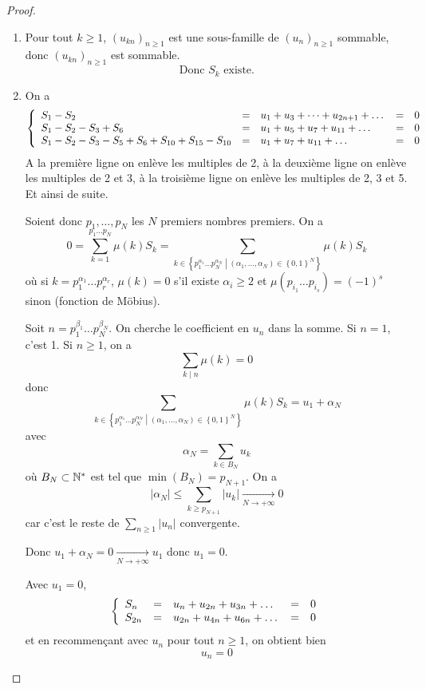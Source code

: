 \begin{proof}
	\phantom{}
	\begin{enumerate}
		\item Pour tout $k\geqslant1$, $\left(u_{kn}\right)_{n\geqslant1}$ est une sous-famille de $\left(u_{n}\right)_{n\geqslant1}$ sommable, donc $\left(u_{kn}\right)_{n\geqslant1}$ est sommable.
		$$\boxed{\text{Donc }S_{k}\text{ existe.}}$$

		\item On a 
		$$
		\left\{
			\begin{array}[]{lllll}
				S_{1}-S_{2} &= &u_{1}+u_{3}+\dots+u_{2n+1}+\dots &= &0\\
				S_{1}-S_{2}-S_{3}+S_{6} &= &u_{1}+u_{5}+u_{7}+u_{11}+\dots &= &0\\
				S_{1}-S_{2}-S_{3}-S_{5}+S_{6}+S_{10}+S_{15}-S_{10} &= &u_{1}+u_{7}+u_{11}+\dots &= &0
			\end{array}
		\right.
		$$
		A la première ligne on enlève les multiples de 2, à la deuxième ligne on enlève les multiples de 2 et 3, à la troisième ligne on enlève les multiples de 2, 3 et 5. Et ainsi de suite.

		Soient donc $p_{1},\dots,p_{N}$ les $N$ premiers nombres premiers. On a 
		$$0=\sum_{k=1}^{p_{1}\dots p_{N}}\mu(k)S_{k}=\sum_{k\in\left\{p_{1}^{\alpha_{1}}\dots p_{N}^{\alpha_{N}}\middle|\left(\alpha_{1},\dots,\alpha_{N}\right)\in\left\{0,1\right\}^{N}\right\}}\mu(k)S_{k}$$
		où si $k=p_{1}^{\alpha_{1}}\dots p_{r}^{\alpha_{r}}$, $\mu(k)=0$ s'il existe $\alpha_{i}\geqslant 2$ et $\mu\left(p_{i_{1}}\dots p_{i_{s}}\right)=\left(-1\right)^{s}$ sinon (fonction de Möbius).

		Soit $n=p_{1}^{\beta_{1}}\dots p_{N}^{\beta_{N}}$. On cherche le coefficient en $u_{n}$ dans la somme. Si $n=1$, c'est 1. Si $n\geqslant 1$, on a 
		$$\sum_{k\mid n}\mu(k)=0$$
		donc 
		$$\sum_{k\in\left\{p_{1}^{\alpha_{1}}\dots p_{N}^{\alpha_{N}}\middle|\left(\alpha_{1},\dots,\alpha_{N}\right)\in\left\{0,1\right\}^{N}\right\}}\mu(k)S_{k}=u_{1}+\alpha_{N}$$
		avec 
		$$\alpha_{N}=\sum_{k\in B_{N}}u_{k}$$
		où $B_{N}\subset\mathbb{N}^{*}$ est tel que $\min\left(B_{N}\right)=p_{N+1}$. On a 
		$$\left\lvert \alpha_{N}\right\rvert\leqslant\sum_{k\geqslant p_{N+1}}\left\lvert u_{k}\right\rvert\xrightarrow[N\to+\infty]{}0$$
		car c'est le reste de $\sum_{n\geqslant 1}\left\lvert u_n\right\rvert$ convergente.

		Donc $u_{1}+\alpha_{N}=0\xrightarrow[N\to+\infty]{}u_{1}$ donc $u_{1}=0$.

		Avec $u_{1}=0$,
		$$
		\left\{
			\begin{array}[]{lllll}
				S_{n} &= &u_{n}+u_{2n}+u_{3n}+\dots &= &0\\
				S_{2n} &= & u_{2n}+u_{4n}+u_{6n}+\dots &= &0
			\end{array}
		\right.
		$$
		et en recommençant avec $u_{n}$ pour tout $n\geqslant1$, on obtient bien 
		$$\boxed{u_{n}=0}$$
	\end{enumerate}
\end{proof}

